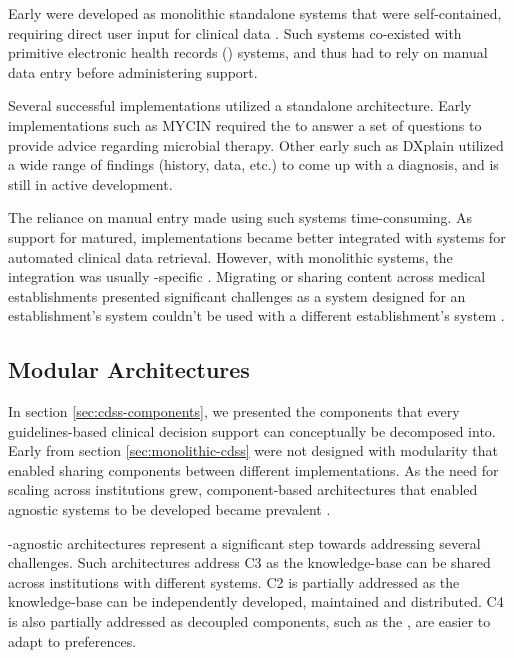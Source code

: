 Early \CDSSs{} were developed as monolithic standalone systems
that were self-contained, requiring direct user input for clinical data
\cite{RodriguezBook16}. Such systems co-existed with
primitive electronic health records (\EHR{}) systems,
and thus had to rely on manual data entry before administering support.

Several successful \CDSSs{} implementations utilized a standalone
architecture. Early \CDSS{} implementations
such as MYCIN \cite{ShortliffeBook12} required the \HCP{}
to answer a set of questions to provide advice regarding microbial therapy.
Other early \CDSSs{} such as DXplain \cite{BarnettJAMA87} utilized a wide
range of findings (history, data, etc.) to come up with a diagnosis, and
is still in active development.

The reliance on manual entry made using such systems time-consuming. As support for \EHR{} matured,
\CDSSs{} implementations became better integrated with \EHR{} systems
for automated clinical data retrieval.
However, with monolithic systems, the integration was usually \EHR{}-specific \cite{RodriguezBook16}.
Migrating or sharing \CDSS{} content across medical establishments
presented significant challenges as a system designed
for an establishment's \EHR{} system couldn't be used with a different
establishment's \EHR{} system \cite{KawamotoJBI10}.

\subsection{Modular \CDSS{} Architectures}

In section \ref{sec:cdss-components}, we presented the components that
every guidelines-based clinical decision support can conceptually be decomposed
into. Early \CDSSs{} from section \ref{sec:monolithic-cdss}
were not designed with modularity that enabled sharing components
between different implementations. As the need for scaling \CDSSs{}
across institutions grew, component-based architectures that
enabled \EHR{} agnostic systems to be developed became prevalent \cite{KawamotoJBI10}.

\EHR{}-agnostic architectures represent a significant step towards
addressing several challenges. Such architectures
address C3 as the knowledge-base can be shared across institutions with
different \EHR{} systems. C2 is partially addressed as the
knowledge-base can be independently developed, maintained and distributed.
C4 is also partially addressed as decoupled components, such as the \UI{},
are easier to adapt to \HCP{} preferences.

